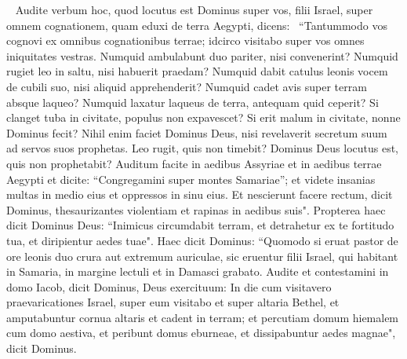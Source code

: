 \begin{biblechapter}   
\verse Audite verbum hoc, quod locutus est Dominus super vos, filii Israel, super omnem cognationem, quam eduxi de terra Aegypti, dicens:  
\verse “Tantummodo vos cognovi ex omnibus cognationibus terrae; idcirco visitabo super vos omnes iniquitates vestras. 
\verse Numquid ambulabunt duo pariter, nisi convenerint? 
\verse Numquid rugiet leo in saltu, nisi habuerit praedam? Numquid dabit catulus leonis vocem de cubili suo, nisi aliquid apprehenderit? 
\verse Numquid cadet avis super terram absque laqueo? Numquid laxatur laqueus de terra, antequam quid ceperit? 
\verse Si clanget tuba in civitate, populus non expavescet? Si erit malum in civitate, nonne Dominus fecit? 
\verse Nihil enim faciet Dominus Deus, nisi revelaverit secretum suum ad servos suos prophetas. 
\verse Leo rugit, quis non timebit? Dominus Deus locutus est, quis non prophetabit? 
\verse Auditum facite in aedibus Assyriae et in aedibus terrae Aegypti et dicite: “Congregamini super montes Samariae”; et videte insanias multas in medio eius et oppressos in sinu eius. 
\verse Et nescierunt facere rectum, dicit Dominus, thesaurizantes violentiam et rapinas in aedibus suis". 
\verse Propterea haec dicit Dominus Deus: “Inimicus circumdabit terram, et detrahetur ex te fortitudo tua, et diripientur aedes tuae". 
\verse Haec dicit Dominus: “Quomodo si eruat pastor de ore leonis duo crura aut extremum auriculae, sic eruentur filii Israel, qui habitant in Samaria, in margine lectuli et in Damasci grabato. 
\verse Audite et contestamini in domo Iacob, dicit Dominus, Deus exercituum: 
\verse In die cum visitavero praevaricationes Israel, super eum visitabo et super altaria Bethel, et amputabuntur cornua altaris et cadent in terram; 
\verse et percutiam domum hiemalem cum domo aestiva, et peribunt domus eburneae, et dissipabuntur aedes magnae", dicit Dominus. 
\end{biblechapter}

